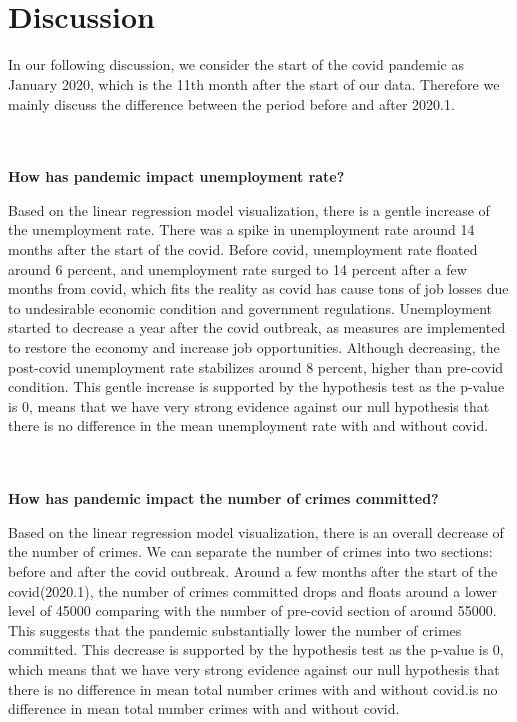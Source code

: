 \documentclass[fontsize=11pt]{article}
\begin{document}
\\ \hspace*{\fill} \\


\section*{Discussion}
In our following discussion, we consider the start of the covid pandemic as January 2020, which is the 11th month after the start of our data.  Therefore we mainly discuss the difference between the period before and after 2020.1.

\\ \hspace*{\fill} \\
\textbf{How has pandemic impact unemployment rate?}

Based on the linear regression model visualization, there is a gentle increase of the unemployment rate. There was a spike in unemployment rate around 14 months after the start of the covid. Before covid, unemployment rate floated around 6 percent, and unemployment rate surged to 14 percent after a few months from covid, which fits the reality as covid has cause tons of job losses due to undesirable economic condition and government regulations. Unemployment started to decrease a year after the covid outbreak, as measures are implemented to restore the economy and increase job opportunities. Although decreasing, the post-covid unemployment rate stabilizes around 8 percent, higher than pre-covid condition. This gentle increase is supported by the hypothesis test as the p-value is 0, means that we have very strong evidence against our null hypothesis that there is no difference in the mean unemployment rate with and without covid.

\\ \hspace*{\fill} \\
\textbf{How has pandemic impact the number of crimes committed?}

Based on the linear regression model visualization, there is an overall decrease of the number of crimes. We can separate the number of crimes into two sections: before and after the covid outbreak. Around a few months after the start of the covid(2020.1), the number of crimes committed drops and floats around a lower level of 45000 comparing with the number of pre-covid section of around 55000. This suggests that the pandemic substantially lower the number of crimes committed. This decrease is supported by the hypothesis test as the p-value is 0, which means that we have very strong evidence against our null hypothesis that there is no difference in mean total number crimes with and without covid.is no difference in mean total number crimes with and without covid.
\end{document}

